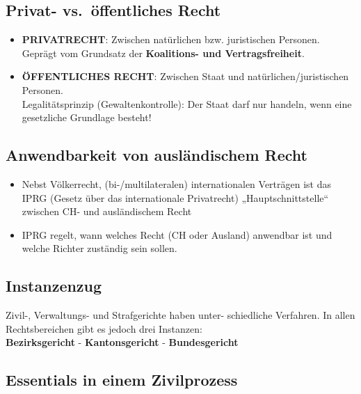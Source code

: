 \hypertarget{privat--vs.uxf6ffentliches-recht}{%
\subsection{Privat- vs.~öffentliches
Recht}\label{privat--vs.uxf6ffentliches-recht}}

\begin{itemize}
\tightlist
\item
  \textbf{PRIVATRECHT}: Zwischen natürlichen bzw. juristischen
  Personen.\\
  Geprägt vom Grundsatz der \textbf{Koalitions- und Vertragsfreiheit}.
\item
  \textbf{ÖFFENTLICHES RECHT}: Zwischen Staat und
  natürlichen/juristischen Personen.\\
  Legalitätsprinzip (Gewaltenkontrolle): Der Staat darf nur handeln,
  wenn eine gesetzliche Grundlage besteht!
\end{itemize}

\hypertarget{anwendbarkeit-von-ausluxe4ndischem-recht}{%
\subsection{Anwendbarkeit von ausländischem
Recht}\label{anwendbarkeit-von-ausluxe4ndischem-recht}}

\begin{itemize}
\tightlist
\item
  Nebst Völkerrecht, (bi-/multilateralen) internationalen Verträgen ist
  das IPRG (Gesetz über das internationale Privatrecht)
  „Hauptschnittstelle`` zwischen CH- und ausländischem Recht
\item
  IPRG regelt, wann welches Recht (CH oder Ausland) anwendbar ist und
  welche Richter zuständig sein sollen.
\end{itemize}

\hypertarget{instanzenzug}{%
\subsection{Instanzenzug}\label{instanzenzug}}

Zivil-, Verwaltungs- und Strafgerichte haben unter- schiedliche
Verfahren. In allen Rechtsbereichen gibt es jedoch drei Instanzen:\\
\textbf{Bezirksgericht} - \textbf{Kantonsgericht} -
\textbf{Bundesgericht}

\hypertarget{essentials-in-einem-zivilprozess}{%
\subsection{Essentials in einem
Zivilprozess}\label{essentials-in-einem-zivilprozess}}

